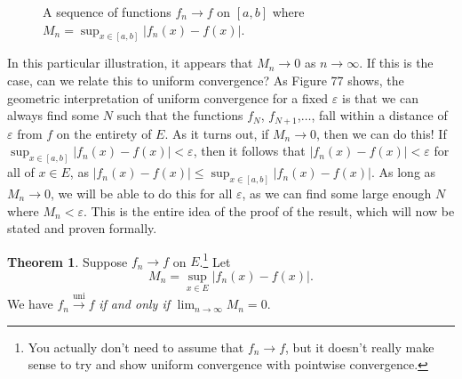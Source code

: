\documentclass{article}
\newcommand{\R}{\mathbb{R}}
\newcommand{\uni}{\overset{\text{uni}}{\to}}
\theoremstyle{definition}
\newtheorem{theorem}{Theorem}[section]
\begin{document}
	\begin{figure}[h!]
		\centering
		\caption{A sequence of functions $ f_n\to f $ on $ [a,b] $ where $ M_n=\sup_{x\in [a,b]}|f_n(x)-f(x)| $.}
	\end{figure}
	In this particular illustration, it appears that $ M_n\to 0 $ as $ n\to\infty $. If this is the case, can we relate this to uniform convergence? As Figure 77 shows, the geometric interpretation of uniform convergence for a fixed $ \varepsilon $ is that we can always find some $ N $ such that the functions $ f_N $, $ f_{N+1} $,$ \ldots $, fall within a distance of $ \varepsilon $ from $ f $ on the entirety of $ E $. As it turns out, if $ M_n\to 0 $, then we can do this! If $ \sup_{x\in [a,b]}|f_n(x)-f(x)|<\varepsilon $, then it follows that $ |f_n(x)-f(x)|<\varepsilon $ for all of $ x\in E $, as $ |f_n(x)-f(x)| \le \sup_{x\in [a,b]}|f_n(x)-f(x)| $. As long as $ M_n\to 0 $, we will be able to do this for all $ \varepsilon $, as we can find some large enough $ N $ where $ M_n<\varepsilon $. This is the entire idea of the proof of the result, which will now be stated and proven formally. 
	\begin{theorem}
		Suppose $ f_n\to f $ on $ E $.\footnote{You actually don't need to assume that $ f_n\to f $, but it doesn't really make sense to try and show uniform convergence with pointwise convergence.} Let $$M_n=\sup_{x\in E}|f_n(x)-f(x)| .$$ We have $ f_n\uni f $ \textit{if and only if} $ \lim_{n\to\infty}M_n=0 $. 
	\end{theorem}
\end{document}
